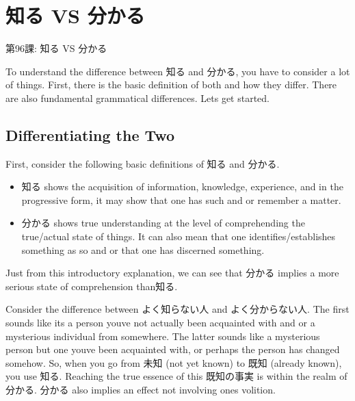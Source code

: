     
\chapter{知る VS 分かる}

\begin{center}
\begin{Large}
第96課: 知る VS 分かる 
\end{Large}
\end{center}
 
\par{ To understand the difference between 知る and 分かる, you have to consider a lot of things. First, there is the basic definition of both and how they differ. There are also fundamental grammatical differences. Let\textquotesingle s get started. }
      
\section{Differentiating the Two}
 
\par{ First, consider the following basic definitions of 知る and 分かる. }

\begin{itemize}

\item 知る shows the acquisition of information, knowledge, experience, and in the progressive form, it may show that one has such and or remember a matter. 
\item 分かる shows true understanding at the level of comprehending the true\slash actual state of things. It can also mean that one identifies\slash establishes something as so and or that one has discerned something. 
\end{itemize}

\par{ Just from this introductory explanation, we can see that 分かる implies a more serious state of comprehension than知る. }

\par{ Consider the difference between よく知らない人 and よく分からない人. The first sounds like it\textquotesingle s a person you\textquotesingle ve not actually been acquainted with and or a mysterious individual from somewhere. The latter sounds like a mysterious person but one you\textquotesingle ve been acquainted with, or perhaps the person has changed somehow. So, when you go from 未知 (not yet known) to 既知 (already known), you use 知る. Reaching the true essence of this 既知の事実 is within the realm of 分かる. 分かる also implies an effect not involving one\textquotesingle s volition. }

